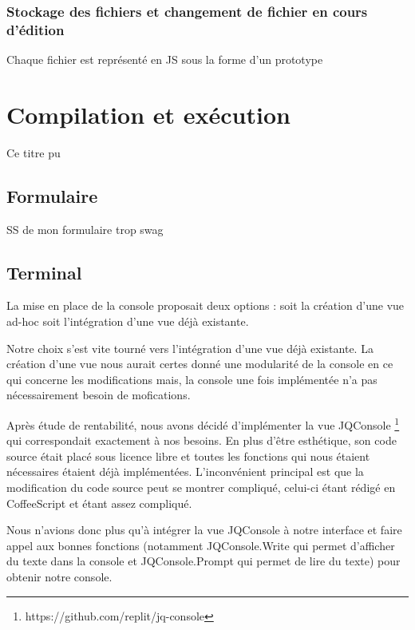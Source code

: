 \subsubsection{Stockage des fichiers et changement de fichier en cours d'édition}

Chaque fichier est représenté en JS sous la forme d'un prototype 


\section{Compilation et exécution}
Ce titre pu

\subsection{Formulaire}

SS de mon formulaire trop swag

\subsection{Terminal}

\par La mise en place de la console proposait deux options : soit la création d'une vue ad-hoc soit l'intégration d'une vue déjà existante.

\par Notre choix s'est vite tourné vers l'intégration d'une vue déjà existante. La création d'une vue nous aurait certes donné une modularité de la console en ce qui concerne les modifications mais, la console une fois implémentée n'a pas nécessairement besoin de mofications.

\par Après étude de rentabilité, nous avons décidé d'implémenter la vue JQConsole \footnote{https://github.com/replit/jq-console} qui correspondait exactement à nos besoins. En plus d'être esthétique, son code source était placé sous licence libre et toutes les fonctions qui nous étaient nécessaires étaient déjà implémentées. L'inconvénient principal est que la modification du code source peut se montrer compliqué, celui-ci étant rédigé en CoffeeScript et étant assez compliqué.

\par Nous n'avions donc plus qu'à intégrer la vue JQConsole à notre interface et faire appel aux bonnes fonctions (notamment JQConsole.Write qui permet d'afficher du texte dans la console et JQConsole.Prompt qui permet de lire du texte) pour obtenir notre console.

